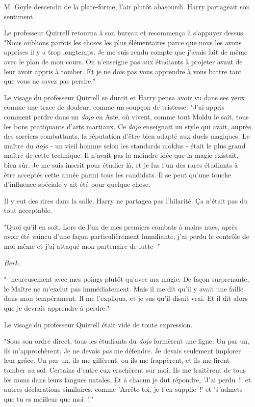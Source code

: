 M. Goyle descendit de la plate-forme, l'air plutôt abasourdi. Harry partageait son sentiment.

Le professeur Quirrell retourna à son bureau et recommença à s'appuyer dessus. "Nous oublions parfois les choses les plus élémentaires parce que nous les avons apprises il y a trop longtemps. Je me suis rendu compte que j'avais fait de même avec le plan de mon cours. On n'enseigne pas aux étudiants à projeter avant de leur avoir appris à tomber. Et je ne dois pas vous apprendre à vous battre tant que vous ne savez pas perdre."

Le visage du professeur Quirrell se durcit et Harry pensa avoir vu dans ses yeux comme une trace de douleur, comme un soupçon de tristesse. "J'ai appris comment perdre dans un \emph{dojo} en Asie, où vivent, comme tout Moldu le sait, tous les bons pratiquants d'arts martiaux. Ce \emph{dojo} enseignait un style qui avait, auprès des sorciers combattants, la réputation d'être bien adapté aux duels magiques. Le maître du \emph{dojo} - un vieil homme selon les standards moldus - était le plus grand maître de cette technique. Il n'avait pas la moindre idée que la magie existait, bien sûr. Je me suis inscrit pour étudier là, et je fus l'un des rares étudiants à être acceptés cette année parmi tous les candidats. Il se peut qu'une touche d'influence spéciale y ait été pour quelque chose.

Il y eut des rires dans la salle. Harry ne partagea pas l'hilarité. Ça n'était pas du tout acceptable.

"Quoi qu'il en soit. Lors de l'un de mes premiers combats à mains nues, après avoir été vaincu d'une façon particulièrement humiliante, j'ai perdu le contrôle de moi-même et j'ai attaqué mon partenaire de lutte -"

\emph{Berk.}

"- heureusement avec mes poings plutôt qu'avec ma magie. De façon surprenante, le Maître ne m'exclut pas immédiatement. Mais il me dit qu'il y avait une faille dans mon tempérament. Il me l'expliqua, et je sus qu'il disait vrai. Et il dit alors que je devrais apprendre à perdre."

Le visage du professeur Quirrell était vide de toute expression.

"Sous son ordre direct, tous les étudiants du \emph{dojo} formèrent une ligne. Un par un, ils m'approchèrent. Je ne devais \emph{pas} me défendre. Je devais seulement implorer leur grâce. Un par un, ils me giflèrent, ou ils me frappèrent, et ils me firent tomber au sol. Certains d'entre eux crachèrent sur moi. Ils me traitèrent de tous les noms dans leurs langues natales. Et à chacun je dut répondre, 'J'ai perdu~!' et autres déclarations similaires, comme 'Arrête-toi, je t'en supplie~!' et 'J'admets que tu es meilleur que moi~!'"

